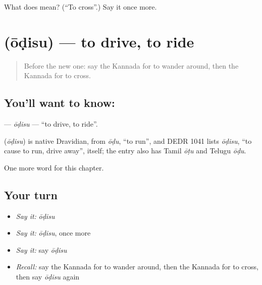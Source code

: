 \begin{tcolorbox}[breakable,colback=teal!4,colframe=teal!35!black,title={Before you move on}]
What does  mean? (\textquotedblleft{}To cross\textquotedblright{}.) Say it once more.
\end{tcolorbox}
\section[\texorpdfstring{\kn{ಓಡಿಸು} (ōḍisu)}{ಓಡಿಸು (ōḍisu)}]{ (ōḍisu) — to drive, to ride}

\label{lesson:KA-C273-odisu}



\begin{quote}
Before the new one: say the Kannada for to wander around, then the Kannada for to cross.
\end{quote}

\subsection*{You'll want to know: }
\textbf{} — \emph{ōḍisu} — \textquotedblleft{}to drive, to ride\textquotedblright{}.

\begin{cousinweb}
\textbf{} (\emph{ōḍisu}) is native Dravidian, from \emph{ōḍu}, \textquotedblleft{}to run\textquotedblright{}, and DEDR 1041 lists \emph{ōḍisu}, \textquotedblleft{}to cause to run, drive away\textquotedblright{}, itself; the entry also has Tamil \emph{ōṭu} and Telugu \emph{ōḍu}.
\end{cousinweb}

\begin{grammarlens}[title={What you've built}]
One more word for this chapter.
\end{grammarlens}

\subsection*{Your turn}
\begin{itemize}
\raggedright
  \item \emph{Say it:} \emph{ōḍisu}
  \item \emph{Say it:} \emph{ōḍisu}, once more
  \item \emph{Say it:} say \emph{ōḍisu}
  \item \emph{Recall:} say the Kannada for to wander around, then the Kannada for to cross, then say \emph{ōḍisu} again
\end{itemize}

